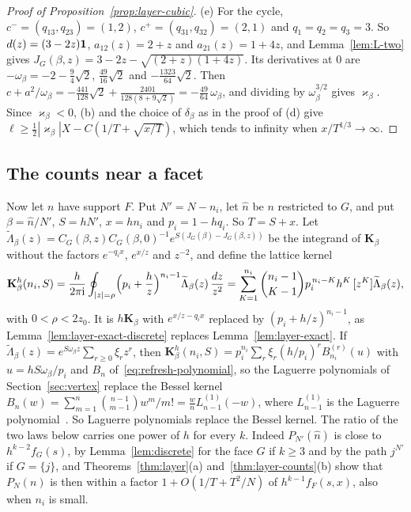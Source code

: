 \begin{proof}[Proof of Proposition~\ref{prop:layer-cubic}]
(e) For the cycle, $c^-=(q_{13},q_{23})=(1,2)$, $c^+=(q_{31},q_{32})=(2,1)$ and $q_1=q_2=q_3=3$.
So $d(z)=(3-2z)\mathbf{1}$, $a_{12}(z)=2+z$ and $a_{21}(z)=1+4z$, and Lemma~\ref{lem:L-two} gives
$J_G(\beta,z)=3-2z-\sqrt{(2+z)(1+4z)}$. Its derivatives at $0$ are $-\omega_\beta=-2-\frac94\sqrt2$,
$\frac{49}{16}\sqrt2$ and $-\frac{1323}{64}\sqrt2$. Then
$c+a^2/\omega_\beta=-\frac{441}{128}\sqrt2+\frac{2401}{128(8+9\sqrt2)}=-\frac{49}{64}\,\omega_\beta$,
and dividing by $\omega_\beta^{3/2}$ gives $\varkappa_\beta$. Since $\varkappa_\beta<0$, (b) and the
choice of $\delta_\beta$ as in the proof of (d) give $\ell\ge\frac12|\varkappa_\beta|X-C(1/T+\sqrt{x/T})$, which tends to
infinity when $x/T^{1/3}\to\infty$.
\end{proof}

\subsection{The counts near a facet}\label{sec:layer-counts}

Now let $n$ have support $F$. Put $N'=N-n_i$, let $\hat n$ be $n$ restricted to $G$, and put
$\beta=\hat n/N'$, $S=hN'$, $x=hn_i$ and $p_i=1-hq_i$. So $T=S+x$. Let
$\widetilde\Lambda_\beta(z)=C_G(\beta,z)C_G(\beta,0)^{-1}e^{S(J_G(\beta)-J_G(\beta,z))}$ be the
integrand of $\mathbf K_\beta$ without the factors $e^{-q_ix}$, $e^{x/z}$ and $z^{-2}$, and define the
lattice kernel
\[
\mathbf K^h_\beta(n_i,S)=\frac h{2\pi\mathrm i}\oint_{|z|=\rho}\Bigl(p_i+\frac hz\Bigr)^{n_i-1}\widetilde\Lambda_\beta(z)\,\frac{dz}{z^2}
=\sum_{K=1}^{n_i}\binom{n_i-1}{K-1}p_i^{\,n_i-K}h^K\,[z^K]\widetilde\Lambda_\beta(z),
\]
with $0<\rho<2z_0$. It is $h\mathbf K_\beta$ with $e^{x/z-q_ix}$ replaced by $(p_i+h/z)^{n_i-1}$, as
Lemma~\ref{lem:layer-exact-discrete} replaces Lemma~\ref{lem:layer-exact}. If
$\widetilde\Lambda_\beta(z)=e^{S\omega_\beta z}\sum_{r\ge0}\xi_rz^r$, then
$\mathbf K^h_\beta(n_i,S)=p_i^{n_i}\sum_r\xi_r(h/p_i)^rB^{(r)}_{n_i}(u)$ with $u=hS\omega_\beta/p_i$
and \ifarxivbuild $B_n$ of~\eqref{eq:refresh-polynomial}, so the Laguerre polynomials of
Section~\ref{sec:vertex} replace the Bessel kernel\else
$B_n(w)=\sum_{m=1}^n\binom{n-1}{m-1}w^m/m!=\frac wnL^{(1)}_{n-1}(-w)$, where $L^{(1)}_{n-1}$ is the
Laguerre polynomial~\cite[Eq.~18.5.12]{dlmf}. So Laguerre polynomials replace the Bessel kernel\fi. The ratio of the two laws below carries one
power of $h$ for every $k$. Indeed $P_{N'}(\hat n)$ is close to $h^{k-2}f_G(s)$, by
Lemma~\ref{lem:discrete} for the face $G$ if $k\ge3$ and by the path $j^{N'}$ if $G=\{j\}$,
and Theorems~\ref{thm:layer}(a)
and~\ref{thm:layer-counts}(b) show that $P_N(n)$ is then within a factor $1+O(1/T+T^2/N)$ of
$h^{k-1}f_F(s,x)$, also when $n_i$ is small.

